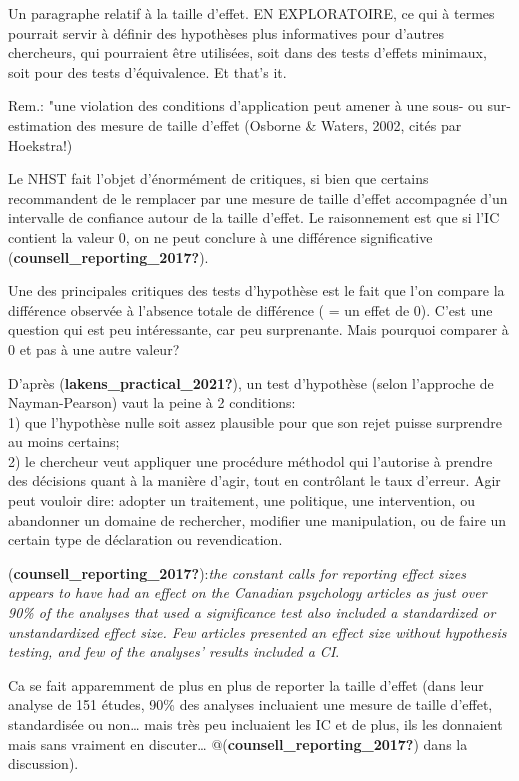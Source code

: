 \documentclass[
  english,
  man]{apa6}
\begin{document}
Un paragraphe relatif à la taille d'effet. EN EXPLORATOIRE, ce qui à termes pourrait servir à définir des hypothèses plus informatives pour d'autres chercheurs, qui pourraient être utilisées, soit dans des tests d'effets minimaux, soit pour des tests d'équivalence. Et that's it.

Rem.: "une violation des conditions d'application peut amener à une sous- ou sur-estimation des mesure de taille d'effet (Osborne \& Waters, 2002, cités par Hoekstra!)

Le NHST fait l'objet d'énormément de critiques, si bien que certains recommandent de le remplacer par une mesure de taille d'effet accompagnée d'un intervalle de confiance autour de la taille d'effet. Le raisonnement est que si l'IC contient la valeur 0, on ne peut conclure à une différence significative (\textbf{counsell\_reporting\_2017?}).

Une des principales critiques des tests d'hypothèse est le fait que l'on compare la différence observée à l'absence totale de différence ( = un effet de 0). C'est une question qui est peu intéressante, car peu surprenante. Mais pourquoi comparer à 0 et pas à une autre valeur?

D'après (\textbf{lakens\_practical\_2021?}), un test d'hypothèse (selon l'approche de Nayman-Pearson) vaut la peine à 2 conditions:\\
1) que l'hypothèse nulle soit assez plausible pour que son rejet puisse surprendre au moins certains;\\
2) le chercheur veut appliquer une procédure méthodol qui l'autorise à prendre des décisions quant à la manière d'agir, tout en contrôlant le taux d'erreur. Agir peut vouloir dire: adopter un traitement, une politique, une intervention, ou abandonner un domaine de rechercher, modifier une manipulation, ou de faire un certain type de déclaration ou revendication.

(\textbf{counsell\_reporting\_2017?}):\emph{the constant calls for reporting effect sizes appears to have had an effect on the Canadian psychology articles as just over 90\% of the analyses that used a significance test also included a standardized or unstandardized effect size. Few articles presented an effect size without hypothesis testing, and few of the analyses' results included a CI}.

Ca se fait apparemment de plus en plus de reporter la taille d'effet (dans leur analyse de 151 études, 90\% des analyses incluaient une mesure de taille d'effet, standardisée ou non\ldots{} mais très peu incluaient les IC et de plus, ils les donnaient mais sans vraiment en discuter\ldots{} @(\textbf{counsell\_reporting\_2017?}) dans la discussion).
\end{document}
